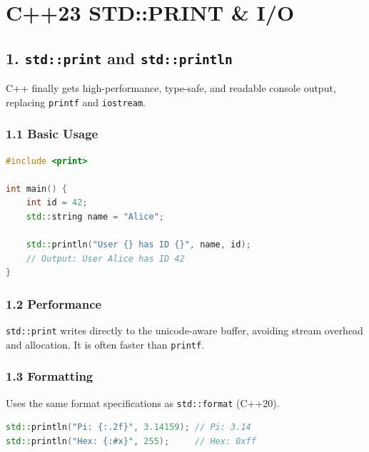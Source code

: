 \hypertarget{c23-stdprint-io}{%
\chapter{C++23 STD::PRINT \& I/O}\label{c23-stdprint-io}}

\hypertarget{stdprint-and-stdprintln}{%
\section{\texorpdfstring{1. \texttt{std::print} and
\texttt{std::println}}{1. std::print and std::println}}\label{stdprint-and-stdprintln}}

C++ finally gets high-performance, type-safe, and readable console
output, replacing \passthrough{\lstinline!printf!} and
\passthrough{\lstinline!iostream!}.

\hypertarget{basic-usage}{%
\subsection{1.1 Basic Usage}\label{basic-usage}}

\begin{lstlisting}[language={C++}]
#include <print>

int main() {
    int id = 42;
    std::string name = "Alice";
    
    std::println("User {} has ID {}", name, id);
    // Output: User Alice has ID 42
}
\end{lstlisting}

\hypertarget{performance}{%
\subsection{1.2 Performance}\label{performance}}

\passthrough{\lstinline!std::print!} writes directly to the
unicode-aware buffer, avoiding stream overhead and allocation. It is
often faster than \passthrough{\lstinline!printf!}.

\hypertarget{formatting}{%
\subsection{1.3 Formatting}\label{formatting}}

Uses the same format specifications as
\passthrough{\lstinline!std::format!} (C++20).

\begin{lstlisting}[language={C++}]
std::println("Pi: {:.2f}", 3.14159); // Pi: 3.14
std::println("Hex: {:#x}", 255);     // Hex: 0xff
\end{lstlisting}

